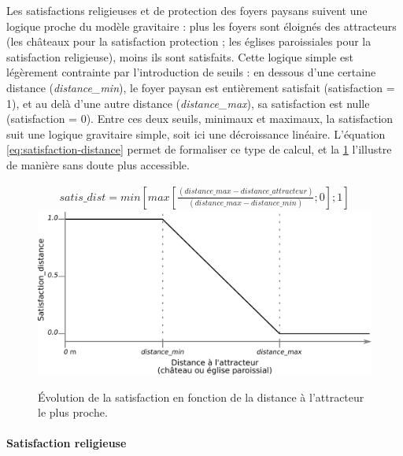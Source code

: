 Les satisfactions religieuses et de protection des foyers paysans suivent une logique proche du modèle gravitaire : plus les foyers sont éloignés des \og attracteurs\fg{} (les châteaux pour la satisfaction protection ; les églises paroissiales pour la satisfaction religieuse), moins ils sont satisfaits.
Cette logique simple est légèrement contrainte par l'introduction de seuils : en dessous d'une certaine distance (\textit{distance\_min}), le foyer paysan est entièrement satisfait (satisfaction = 1), et au delà d'une autre distance (\textit{distance\_max}), sa satisfaction est nulle (satisfaction = 0).
Entre ces deux seuils, minimaux et maximaux, la satisfaction suit une logique gravitaire simple, soit ici une décroissance linéaire.
L'équation \ref{eq:satisfaction-distance} permet de formaliser ce type de calcul, et la \cref{fig:satisfaction-distance} l'illustre de manière sans doute plus accessible.

\begin{figure}[H]
	\centering
	\begin{equation}\label{eq:satisfaction-distance}
	\begin{gathered}
	satis\_dist = min  \left \lbrack max \left \lbrack \frac{(distance\_max - distance\_attracteur)}{(distance\_max -distance\_min)}; 0 \right \rbrack ; 1 \right \rbrack
	\end{gathered}
	\end{equation}
	\includegraphics[width=.8\linewidth]{img/satisfaction_distance.pdf}
	\caption{Évolution de la satisfaction en fonction de la distance à l'attracteur le plus proche.}
	\label{fig:satisfaction-distance}
\end{figure}

\paragraph{Satisfaction religieuse}
		
